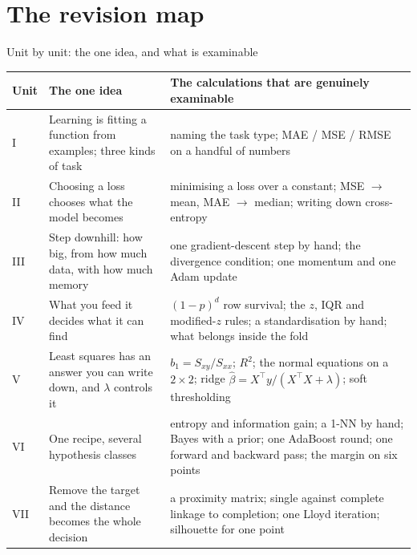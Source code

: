 \documentclass[aspectratio=169]{beamer}
\begin{document}
\section[Revision map]{The revision map}
\label{sec:map}

\begin{frame}[shrink=14]{Unit by unit: the one idea, and what is examinable}
  \centering
  \begin{tabular}{@{}p{1.5cm}p{5.6cm}p{6.8cm}@{}}
    \toprule
    \textbf{Unit} & \textbf{The one idea} & \textbf{The calculations that are
      genuinely examinable} \\
    \midrule
    I & Learning is fitting a function from examples; three kinds of task &
      naming the task type; MAE / MSE / RMSE on a handful of numbers \\
    II & Choosing a loss chooses what the model becomes &
      minimising a loss over a constant; MSE $\to$ mean, MAE $\to$ median;
      writing down cross-entropy \\
    III & Step downhill: how big, from how much data, with how much memory &
      one gradient-descent step by hand; the divergence condition; one
      momentum and one Adam update \\
    IV & What you feed it decides what it can find &
      $(1-p)^d$ row survival; the $z$, IQR and modified-$z$ rules; a
      standardisation by hand; what belongs inside the fold \\
    V & Least squares has an answer you can write down, and $\lambda$
      controls it &
      $b_1 = S_{xy}/S_{xx}$; $R^2$; the normal equations on a $2 \times 2$;
      ridge $\hat\beta = X^\top y / (X^\top X + \lambda)$; soft thresholding \\
    VI & One recipe, several hypothesis classes &
      entropy and information gain; a 1-NN by hand; Bayes with a prior; one
      AdaBoost round; one forward and backward pass; the margin on
      six points \\
    VII & Remove the target and the distance becomes the whole decision &
      a proximity matrix; single against complete linkage to completion; one
      Lloyd iteration; silhouette for one point \\
    \bottomrule
  \end{tabular}
\end{frame}
\end{document}

